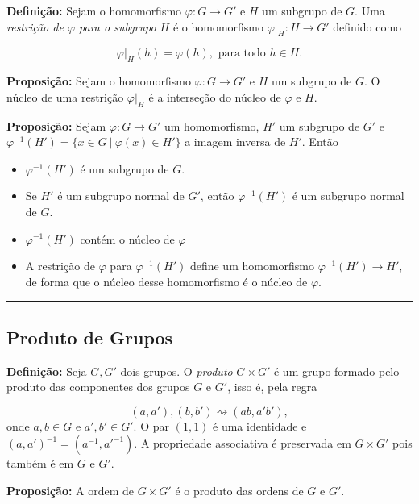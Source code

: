 \documentclass[11pt]{article}
\providecommand{\tightlist}{%
      \setlength{\itemsep}{0pt}\setlength{\parskip}{0pt}}
\begin{document}
\textbf{Definição:} Sejam o homomorfismo \(\varphi:G\longrightarrow G'\)
e \(H\) um subgrupo de \(G\). Uma \emph{restrição de \(\varphi\) para o
subgrupo \(H\)} é o homomorfismo \(\varphi|_H:H\longrightarrow G'\)
definido como

\[\varphi|_H(h) = \varphi(h), \text{ para todo }h\in H.\]

\textbf{Proposição:} Sejam o homomorfismo
\(\varphi:G\longrightarrow G'\) e \(H\) um subgrupo de \(G\). O núcleo
de uma restrição \(\varphi|_H\) é a interseção do núcleo de \(\varphi\)
e \(H\).

\textbf{Proposição:} Sejam \(\varphi:G\longrightarrow G'\) um
homomorfismo, \(H'\) um subgrupo de \(G'\) e
\(\varphi^{-1}(H') = \{x \in G \ | \ \varphi(x) \in H'\}\) a imagem
inversa de \(H'\). Então

\begin{itemize}
\tightlist
\item
  \(\varphi^{-1}(H')\) é um subgrupo de \(G\).
\item
  Se \(H'\) é um subgrupo normal de \(G'\), então \(\varphi^{-1}(H')\) é
  um subgrupo normal de \(G\).
\item
  \(\varphi^{-1}(H')\) contém o núcleo de \(\varphi\)
\item
  A restrição de \(\varphi\) para \(\varphi^{-1}(H')\) define um
  homomorfismo \(\varphi^{-1}(H')\longrightarrow H'\), de forma que o
  núcleo desse homomorfismo é o núcleo de \(\varphi\).
\end{itemize}

\begin{center}\rule{0.5\linewidth}{0.5pt}\end{center}

\hypertarget{produto-de-grupos}{%
\subsection{Produto de Grupos}\label{produto-de-grupos}}

\textbf{Definição:} Seja \(G,G'\) dois grupos. O \emph{produto}
\(G\times G'\) é um grupo formado pelo produto das componentes dos
grupos \(G\) e \(G'\), isso é, pela regra

\[ (a,a'), (b,b') \rightsquigarrow (ab,a'b'), \] onde \(a,b \in G\) e
\(a',b'\in G'\). O par \((1,1)\) é uma identidade e
\((a,a')^{-1} = (a^{-1},a'^{-1})\). A propriedade associativa é
preservada em \(G\times G'\) pois também é em \(G\) e \(G'\).

\textbf{Proposição:} A ordem de \(G\times G'\) é o produto das ordens de
\(G\) e \(G'\).
\end{document}

